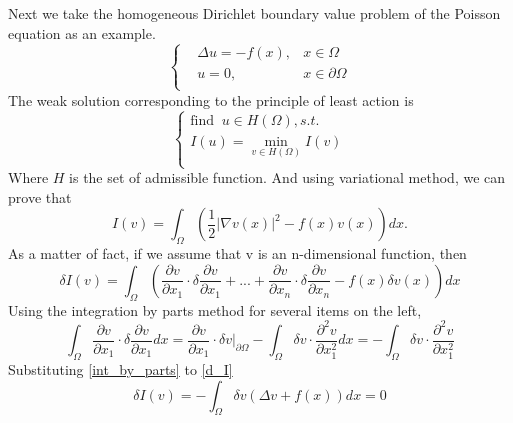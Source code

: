 \documentclass{article}
\begin{document}
\par Next we take the homogeneous Dirichlet boundary value problem of the Poisson equation as an example.
\begin{equation}
\left\{
\begin{aligned}
& \Delta u=-f(x),&x\in \Omega \\
 &u=0,&x\in \partial \Omega \\
 \end{aligned}
\right.
\end{equation}
The weak solution corresponding to the principle of least action is
\begin{equation}
\left\{
\begin{aligned}
 \text{find }\ u\in H(\Omega), s.t.\\
 I(u)=\min\limits_{v\in H(\Omega)}I(v)\\
  \end{aligned}
\right.
\end{equation}
Where $H$ is the set of admissible function. And using variational method, we can prove that 
\begin{equation} 
I(v)=\int_\Omega\left(\frac{1}{2}|\nabla v(x)|^2-f(x)v(x)\right)dx. 
\end{equation}
As a matter of fact, if we assume that v is an n-dimensional function, then
\begin{equation}\label{d_I}
\delta I(v)=\int _{\Omega} \left(\frac{\partial v}{\partial x_1}\cdot \delta \frac{\partial v}{\partial x_1}+...+\frac{\partial v}{\partial x_n}\cdot   \delta \frac{\partial v}{\partial x_n}-f(x)\delta      v(x)   \right)dx
\end{equation}
Using the integration by parts method for several items on the left,
\begin{equation}\label{int_by_parts}
\int _{\Omega}\frac{\partial v}{\partial x_1}\cdot \delta \frac{\partial v}{\partial x_1} dx= \frac{\partial v}{\partial x_1}\cdot \delta v\Big|_{\partial \Omega}-\int_{\Omega}\delta v \cdot \frac{\partial^2 v}{\partial x_1 ^2}dx=-\int_{\Omega}\delta v \cdot \frac{\partial^2 v}{\partial x_1 ^2}
\end{equation}
Substituting \eqref{int_by_parts} to \eqref{d_I}
\begin{equation}
\delta I(v)=-\int_{\Omega}\delta v(\Delta v+f(x))dx=0
\end{equation}
\end{document}
